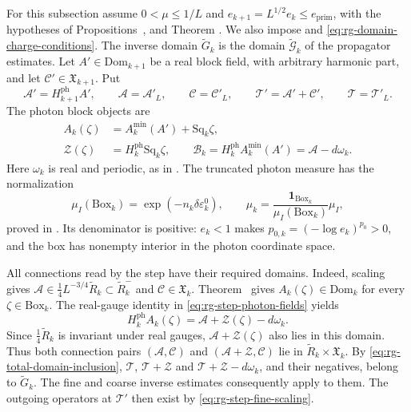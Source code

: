 For this subsection assume $0<\mu\le1/L$ and
$e_{k+1}=L^{1/2}e_k\le e_{\mathrm{prim}}$, with the hypotheses
of Propositions~,
 and Theorem
. We also impose
 and
\eqref{eq:rg-domain-charge-conditions}.
The inverse domain $\widetilde G_k$ is the domain
$\widetilde{\mathcal G}_k$ of the propagator estimates.
Let $A'\in\mathrm{Dom}_{k+1}$ be a real block field,
with arbitrary harmonic part, and let
$\mathscr C'\in\mathfrak X_{k+1}$.
Put
\[
 \mathscr A'=H_{k+1}^{\mathrm{ph}}A',\qquad
 \mathscr A=\mathscr A'_L,\qquad
 \mathscr C=\mathscr C'_L,\qquad
 \mathscr T'=\mathscr A'+\mathscr C',\qquad
 \mathscr T=\mathscr T'_L.
\]
The photon block objects are
\begin{equation}\label{eq:rg-step-photon-fields}
 \begin{split}
 A_k(\zeta)&=A_k^{\min}(A')+\mathrm{Sq}_k\zeta,\\
 \mathscr Z(\zeta)&=H_k^{\mathrm{ph}}\mathrm{Sq}_k\zeta,\qquad
 \mathscr B_k=H_k^{\mathrm{ph}}A_k^{\min}(A')
                                      =\mathscr A-d\omega_k.
 \end{split}
\end{equation}
Here $\omega_k$ is real and periodic, as in
.
The truncated photon measure has the normalization
\begin{equation}\label{eq:rg-step-box-normalization}
 \mu_I(\mathrm{Box}_k)=\exp(-n_k\delta\varepsilon_k^0),\qquad
 \widehat\mu_k=
              \frac{\mathbf1_{\mathrm{Box}_k}}{\mu_I(\mathrm{Box}_k)}\mu_I,
\end{equation}
proved in .
Its denominator is positive: $e_k<1$ makes
$p_{0,k}=(-\log e_k)^{p_0}>0$, and the box has
nonempty interior in the photon coordinate space.

All connections read by the step have their required
domains. Indeed, scaling gives
$\mathscr A\in\frac14L^{-3/4}\widetilde R_k
\subset\widetilde R_k^-$ and
$\mathscr C\in\mathfrak X_k$.
Theorem~
gives $A_k(\zeta)\in\mathrm{Dom}_k$ for every
$\zeta\in\mathrm{Box}_k$.
The real-gauge identity in
\eqref{eq:rg-step-photon-fields} yields
\[
 H_k^{\mathrm{ph}}A_k(\zeta)
                 =\mathscr A+\mathscr Z(\zeta)-d\omega_k.
\]
Since $\frac14\widetilde R_k$ is invariant under
real gauges, $\mathscr A+\mathscr Z(\zeta)$ also
lies in this domain. Thus both connection pairs
$(\mathscr A,\mathscr C)$ and
$(\mathscr A+\mathscr Z,\mathscr C)$ lie in
$\widetilde R_k\times\mathfrak X_k$.
By \eqref{eq:rg-total-domain-inclusion},
$\mathscr T$, $\mathscr T+\mathscr Z$ and
$\mathscr T+\mathscr Z-d\omega_k$, and their negatives,
belong to $\widetilde G_k$.
The fine and coarse inverse estimates consequently
apply to them. The outgoing operators at
$\mathscr T'$ then exist by
\eqref{eq:rg-step-fine-scaling}.

